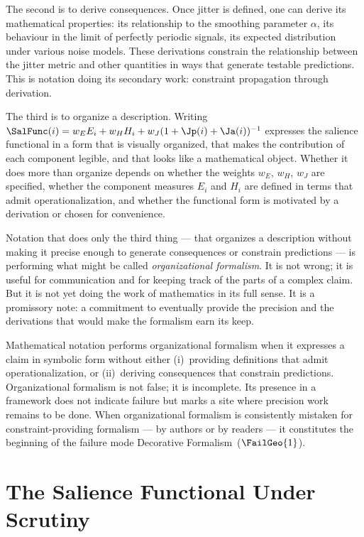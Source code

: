 The second is to derive consequences. Once jitter is defined,
one can derive its mathematical properties: its relationship
to the smoothing parameter $\alpha$, its behaviour in the
limit of perfectly periodic signals, its expected distribution
under various noise models. These derivations constrain the
relationship between the jitter metric and other quantities
in ways that generate testable predictions. This is notation
doing its secondary work: constraint propagation through derivation.

The third is to organize a description. Writing
$\SalFunc(i) = w_E E_i + w_H H_i + w_J(1 + \Jp(i) + \Ja(i))^{-1}$
expresses the salience functional in a form that is
visually organized, that makes the contribution of each
component legible, and that looks like a mathematical object.
Whether it does more than organize depends on whether the
weights $w_E$, $w_H$, $w_J$ are specified, whether the
component measures $E_i$ and $H_i$ are defined in terms
that admit operationalization, and whether the functional
form is motivated by a derivation or chosen for convenience.

Notation that does only the third thing --- that organizes
a description without making it precise enough to generate
consequences or constrain predictions --- is performing
what might be called \textit{organizational formalism}.
It is not wrong; it is useful for communication and for
keeping track of the parts of a complex claim. But it is
not yet doing the work of mathematics in its full sense.
It is a promissory note: a commitment to eventually provide
the precision and the derivations that would make the
formalism earn its keep.

\begin{auditprop}
\label{ap:organizational-formalism}
Mathematical notation performs organizational formalism
when it expresses a claim in symbolic form without either
(i)~providing definitions that admit operationalization,
or (ii)~deriving consequences that constrain predictions.
Organizational formalism is not false; it is incomplete.
Its presence in a framework does not indicate failure but
marks a site where precision work remains to be done.
When organizational formalism is consistently mistaken for
constraint-providing formalism --- by authors or by readers
--- it constitutes the beginning of the failure mode
Decorative Formalism~($\FailGeo{1}$).
\end{auditprop}

\section{The Salience Functional Under Scrutiny}
\label{sec:salience-scrutiny}


